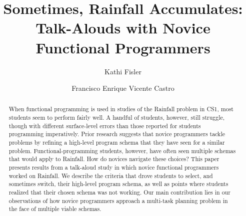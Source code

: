 \documentclass[sigconf]{acmart}
\begin{document}
\title{Sometimes, Rainfall Accumulates: \\ Talk-Alouds with
  Novice Functional Programmers}

\author{Kathi Fisler}

\author{Francisco Enrique Vicente Castro}

\renewcommand{\shortauthors}{Fisler and Castro}


\begin{abstract}
  When functional programming is used in studies of the Rainfall
  problem in CS1, most students seem to perform fairly well.  A
  handful of students, however, still struggle, though with different
  surface-level errors than those reported for students programming
  imperatively.  Prior research suggests that novice programmers
  tackle problems by refining a high-level program schema that they
  have seen for a similar problem.  Functional-programming students,
  however, have often seen multiple schemas that would apply to
  Rainfall. How do novices navigate these choices?  This paper
  presents results from a talk-aloud study in which novice functional
  programmers worked on Rainfall.  We describe the criteria that drove
  students to select, and sometimes switch, their high-level program
  schema, as well as points where students realized that their chosen
  schema was not working.  Our main contribution lies in our
  observations of how novice programmers approach a multi-task planning
  problem in the face of multiple viable schemas.
\end{abstract}
\end{document}
